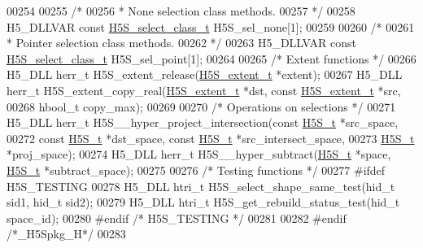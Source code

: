 \begin{DoxyCode}
00254 
00255 \textcolor{comment}{/*}
00256 \textcolor{comment}{ * None selection class methods.}
00257 \textcolor{comment}{ */}
00258 H5\_DLLVAR \textcolor{keyword}{const} \hyperlink{struct_h5_s__select__class__t}{H5S\_select\_class\_t} H5S\_sel\_none[1];
00259 
00260 \textcolor{comment}{/*}
00261 \textcolor{comment}{ * Pointer selection class methods.}
00262 \textcolor{comment}{ */}
00263 H5\_DLLVAR \textcolor{keyword}{const} \hyperlink{struct_h5_s__select__class__t}{H5S\_select\_class\_t} H5S\_sel\_point[1];
00264 
00265 \textcolor{comment}{/* Extent functions */}
00266 H5\_DLL herr\_t H5S\_extent\_release(\hyperlink{struct_h5_s__extent__t}{H5S\_extent\_t} *extent);
00267 H5\_DLL herr\_t H5S\_extent\_copy\_real(\hyperlink{struct_h5_s__extent__t}{H5S\_extent\_t} *dst, \textcolor{keyword}{const} 
      \hyperlink{struct_h5_s__extent__t}{H5S\_extent\_t} *src,
00268     hbool\_t copy\_max);
00269 
00270 \textcolor{comment}{/* Operations on selections */}
00271 H5\_DLL herr\_t H5S\_\_hyper\_project\_intersection(\textcolor{keyword}{const} \hyperlink{struct_h5_s__t}{H5S\_t} *src\_space,
00272     \textcolor{keyword}{const} \hyperlink{struct_h5_s__t}{H5S\_t} *dst\_space, \textcolor{keyword}{const} \hyperlink{struct_h5_s__t}{H5S\_t} *src\_intersect\_space,
00273     \hyperlink{struct_h5_s__t}{H5S\_t} *proj\_space);
00274 H5\_DLL herr\_t H5S\_\_hyper\_subtract(\hyperlink{struct_h5_s__t}{H5S\_t} *space, \hyperlink{struct_h5_s__t}{H5S\_t} *subtract\_space);
00275 
00276 \textcolor{comment}{/* Testing functions */}
00277 \textcolor{preprocessor}{#ifdef H5S\_TESTING}
00278 H5\_DLL htri\_t H5S\_select\_shape\_same\_test(hid\_t sid1, hid\_t sid2);
00279 H5\_DLL htri\_t H5S\_get\_rebuild\_status\_test(hid\_t space\_id);
00280 \textcolor{preprocessor}{#endif }\textcolor{comment}{/* H5S\_TESTING */}\textcolor{preprocessor}{}
00281 
00282 \textcolor{preprocessor}{#endif }\textcolor{comment}{/*\_H5Spkg\_H*/}\textcolor{preprocessor}{}
00283 
\end{DoxyCode}
